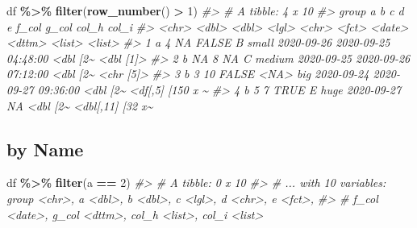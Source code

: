 \documentclass[
]{report}
\newenvironment{Shaded}{\begin{snugshade}}{\end{snugshade}}
\newcommand{\CommentTok}[1]{\textcolor[rgb]{0.56,0.35,0.01}{\textit{#1}}}
\newcommand{\DecValTok}[1]{\textcolor[rgb]{0.00,0.00,0.81}{#1}}
\newcommand{\KeywordTok}[1]{\textcolor[rgb]{0.13,0.29,0.53}{\textbf{#1}}}
\newcommand{\NormalTok}[1]{#1}
\newcommand{\OperatorTok}[1]{\textcolor[rgb]{0.81,0.36,0.00}{\textbf{#1}}}
\newcommand{\StringTok}[1]{\textcolor[rgb]{0.31,0.60,0.02}{#1}}
\begin{document}
\begin{Shaded}
\begin{Highlighting}[]
\NormalTok{df }\OperatorTok{\%\textgreater{}\%}
\StringTok{  }\KeywordTok{filter}\NormalTok{(}\KeywordTok{row\_number}\NormalTok{() }\OperatorTok{\textgreater{}}\StringTok{ }\DecValTok{1}\NormalTok{)}
\CommentTok{\#\textgreater{} \# A tibble: 4 x 10}
\CommentTok{\#\textgreater{}   group     a     b c     d     e      f\_col      g\_col               col\_h    col\_i           }
\CommentTok{\#\textgreater{}   \textless{}chr\textgreater{} \textless{}dbl\textgreater{} \textless{}dbl\textgreater{} \textless{}lgl\textgreater{} \textless{}chr\textgreater{} \textless{}fct\textgreater{}  \textless{}date\textgreater{}     \textless{}dttm\textgreater{}              \textless{}list\textgreater{}   \textless{}list\textgreater{}          }
\CommentTok{\#\textgreater{} 1 a         4    NA FALSE B     small  2020{-}09{-}26 2020{-}09{-}25 04:48:00 \textless{}dbl [2\textasciitilde{} \textless{}dbl [1]\textgreater{}       }
\CommentTok{\#\textgreater{} 2 b        NA     8 NA    C     medium 2020{-}09{-}25 2020{-}09{-}26 07:12:00 \textless{}dbl [2\textasciitilde{} \textless{}chr [5]\textgreater{}       }
\CommentTok{\#\textgreater{} 3 b         3    10 FALSE \textless{}NA\textgreater{}  big    2020{-}09{-}24 2020{-}09{-}27 09:36:00 \textless{}dbl [2\textasciitilde{} \textless{}df[,5] [150 x \textasciitilde{}}
\CommentTok{\#\textgreater{} 4 b         5     7 TRUE  E     huge   2020{-}09{-}27 NA                  \textless{}dbl [2\textasciitilde{} \textless{}dbl[,11] [32 x\textasciitilde{}}
\end{Highlighting}
\end{Shaded}

\hypertarget{by-name-1}{%
\subsection{by Name}\label{by-name-1}}

\begin{Shaded}
\begin{Highlighting}[]
\NormalTok{df }\OperatorTok{\%\textgreater{}\%}
\StringTok{  }\KeywordTok{filter}\NormalTok{(a }\OperatorTok{==}\StringTok{ }\DecValTok{2}\NormalTok{)}
\CommentTok{\#\textgreater{} \# A tibble: 0 x 10}
\CommentTok{\#\textgreater{} \# ... with 10 variables: group \textless{}chr\textgreater{}, a \textless{}dbl\textgreater{}, b \textless{}dbl\textgreater{}, c \textless{}lgl\textgreater{}, d \textless{}chr\textgreater{}, e \textless{}fct\textgreater{},}
\CommentTok{\#\textgreater{} \#   f\_col \textless{}date\textgreater{}, g\_col \textless{}dttm\textgreater{}, col\_h \textless{}list\textgreater{}, col\_i \textless{}list\textgreater{}}
\end{Highlighting}
\end{Shaded}
\end{document}
